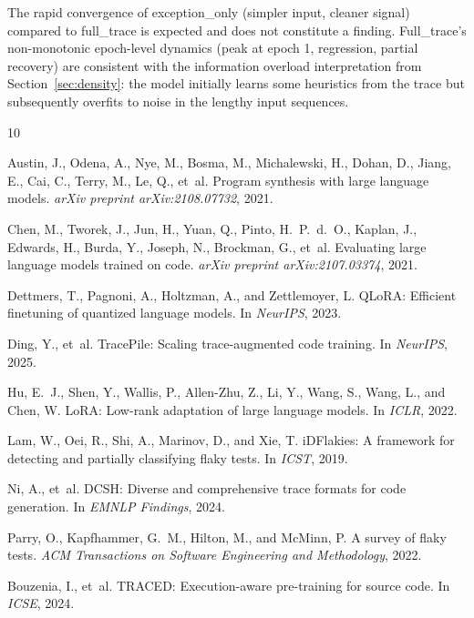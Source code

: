 \documentclass[11pt]{article}
\begin{document}
The rapid convergence of exception\_only (simpler input, cleaner signal) compared to full\_trace is expected and does not constitute a finding. Full\_trace's non-monotonic epoch-level dynamics (peak at epoch 1, regression, partial recovery) are consistent with the information overload interpretation from Section~\ref{sec:density}: the model initially learns some heuristics from the trace but subsequently overfits to noise in the lengthy input sequences.


\begin{thebibliography}{10}

Austin, J., Odena, A., Nye, M., Bosma, M., Michalewski, H., Dohan, D., Jiang, E., Cai, C., Terry, M., Le, Q., et~al.
\newblock Program synthesis with large language models.
\newblock \emph{arXiv preprint arXiv:2108.07732}, 2021.

Chen, M., Tworek, J., Jun, H., Yuan, Q., Pinto, H.~P.~d.~O., Kaplan, J., Edwards, H., Burda, Y., Joseph, N., Brockman, G., et~al.
\newblock Evaluating large language models trained on code.
\newblock \emph{arXiv preprint arXiv:2107.03374}, 2021.

Dettmers, T., Pagnoni, A., Holtzman, A., and Zettlemoyer, L.
\newblock QLoRA: Efficient finetuning of quantized language models.
\newblock In \emph{NeurIPS}, 2023.

Ding, Y., et~al.
\newblock TracePile: Scaling trace-augmented code training.
\newblock In \emph{NeurIPS}, 2025.

Hu, E.~J., Shen, Y., Wallis, P., Allen-Zhu, Z., Li, Y., Wang, S., Wang, L., and Chen, W.
\newblock LoRA: Low-rank adaptation of large language models.
\newblock In \emph{ICLR}, 2022.

Lam, W., Oei, R., Shi, A., Marinov, D., and Xie, T.
\newblock iDFlakies: A framework for detecting and partially classifying flaky tests.
\newblock In \emph{ICST}, 2019.

Ni, A., et~al.
\newblock DCSH: Diverse and comprehensive trace formats for code generation.
\newblock In \emph{EMNLP Findings}, 2024.

Parry, O., Kapfhammer, G.~M., Hilton, M., and McMinn, P.
\newblock A survey of flaky tests.
\newblock \emph{ACM Transactions on Software Engineering and Methodology}, 2022.

Bouzenia, I., et~al.
\newblock TRACED: Execution-aware pre-training for source code.
\newblock In \emph{ICSE}, 2024.

\end{thebibliography}
\end{document}
